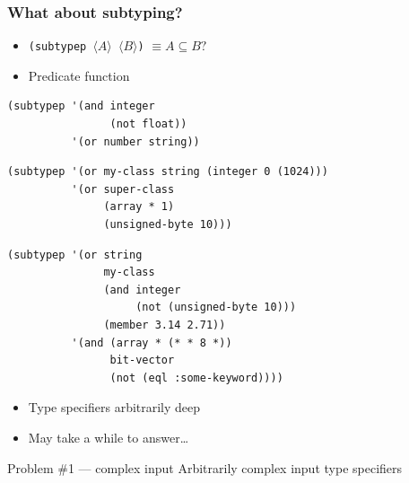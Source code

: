 \documentclass[aspectratio=169]{beamer}
\renewcommand\code[1]{\texttt{#1}}
\newcommand\plholder[1]{\ensuremath{\langle {#1} \rangle}}
\newcommand\emoji[2][\tiny]{{#1#2}}
\begin{document}
\begin{frame}[fragile]
  \frametitle{What about subtyping?}
  \begin{itemize}
  \item \code{(subtypep \plholder A \plholder B)} $\equiv A \subseteq B?$
  \item Predicate function
  \end{itemize}

  \medskip

  \begin{overprint}[\textwidth]
    \begin{mintedcodebox}[title=Quite easy,compact,icon=\(\lambda\)]
\begin{verbatim}
(subtypep '(and integer
                (not float))
          '(or number string))
\end{verbatim}
    \end{mintedcodebox}

    \begin{mintedcodebox}[title=Not that easy after all\dots,compact,icon=\(\lambda\)]
\begin{verbatim}
(subtypep '(or my-class string (integer 0 (1024)))
          '(or super-class
               (array * 1)
               (unsigned-byte 10)))
\end{verbatim}
    \end{mintedcodebox}

    \begin{mintedcodebox}[title=\textnormal{\it ``Oh dear, we are in trouble''
        \emoji{😢}},compact,icon=\(\lambda\)]
\begin{verbatim}
(subtypep '(or string
               my-class
               (and integer
                    (not (unsigned-byte 10)))
               (member 3.14 2.71))
          '(and (array * (* * 8 *))
                bit-vector
                (not (eql :some-keyword))))
\end{verbatim}
    \end{mintedcodebox}
  \end{overprint}

  \begin{popup}{.75}
    \begin{macosbox}{}
      \begin{itemize}
      \item Type specifiers arbitrarily deep
      \item May take a while to answer\dots
      \end{itemize}

      \begin{alertblock}{Problem \#1 --- complex input}
        Arbitrarily complex input type specifiers
      \end{alertblock}
    \end{macosbox}
  \end{popup}
\end{frame}
\end{document}
